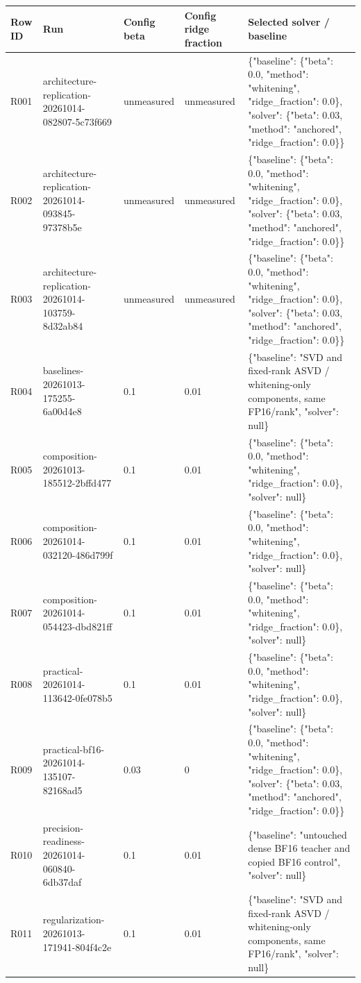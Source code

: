 \documentclass[10pt]{article}
\begin{document}
{\scriptsize\setlength{\tabcolsep}{2pt}
\begin{longtable}{p{}p{}p{}p{}p{}}
Row ID & Run & Config beta & Config ridge fraction & Selected solver / baseline \\
\hline\endhead
R001 & architecture-replication-20261014-082807-5c73f669 & unmeasured & unmeasured & \{"baseline": \{"beta": 0.0, "method": "whitening", "ridge\_fraction": 0.0\}, "solver": \{"beta": 0.03, "method": "anchored", "ridge\_fraction": 0.0\}\} \\
R002 & architecture-replication-20261014-093845-97378b5e & unmeasured & unmeasured & \{"baseline": \{"beta": 0.0, "method": "whitening", "ridge\_fraction": 0.0\}, "solver": \{"beta": 0.03, "method": "anchored", "ridge\_fraction": 0.0\}\} \\
R003 & architecture-replication-20261014-103759-8d32ab84 & unmeasured & unmeasured & \{"baseline": \{"beta": 0.0, "method": "whitening", "ridge\_fraction": 0.0\}, "solver": \{"beta": 0.03, "method": "anchored", "ridge\_fraction": 0.0\}\} \\
R004 & baselines-20261013-175255-6a00d4e8 & 0.1 & 0.01 & \{"baseline": "SVD and fixed-rank ASVD / whitening-only components, same FP16/rank", "solver": null\} \\
R005 & composition-20261013-185512-2bffd477 & 0.1 & 0.01 & \{"baseline": \{"beta": 0.0, "method": "whitening", "ridge\_fraction": 0.0\}, "solver": null\} \\
R006 & composition-20261014-032120-486d799f & 0.1 & 0.01 & \{"baseline": \{"beta": 0.0, "method": "whitening", "ridge\_fraction": 0.0\}, "solver": null\} \\
R007 & composition-20261014-054423-dbd821ff & 0.1 & 0.01 & \{"baseline": \{"beta": 0.0, "method": "whitening", "ridge\_fraction": 0.0\}, "solver": null\} \\
R008 & practical-20261014-113642-0fe078b5 & 0.1 & 0.01 & \{"baseline": \{"beta": 0.0, "method": "whitening", "ridge\_fraction": 0.0\}, "solver": null\} \\
R009 & practical-bf16-20261014-135107-82168ad5 & 0.03 & 0 & \{"baseline": \{"beta": 0.0, "method": "whitening", "ridge\_fraction": 0.0\}, "solver": \{"beta": 0.03, "method": "anchored", "ridge\_fraction": 0.0\}\} \\
R010 & precision-readiness-20261014-060840-6db37daf & 0.1 & 0.01 & \{"baseline": "untouched dense BF16 teacher and copied BF16 control", "solver": null\} \\
R011 & regularization-20261013-171941-804f4c2e & 0.1 & 0.01 & \{"baseline": "SVD and fixed-rank ASVD / whitening-only components, same FP16/rank", "solver": null\} \\
\end{longtable}}
\end{document}
